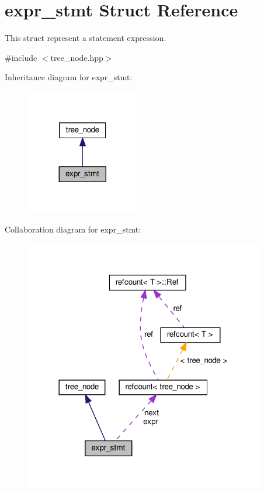 \hypertarget{structexpr__stmt}{}\section{expr\+\_\+stmt Struct Reference}
\label{structexpr__stmt}


This struct represent a statement expression.  




{\ttfamily \#include $<$tree\+\_\+node.\+hpp$>$}



Inheritance diagram for expr\+\_\+stmt\+:
\nopagebreak
\begin{figure}[H]
\begin{center}
\leavevmode
\includegraphics[width=140pt]{dc/deb/structexpr__stmt__inherit__graph}
\end{center}
\end{figure}


Collaboration diagram for expr\+\_\+stmt\+:
\nopagebreak
\begin{figure}[H]
\begin{center}
\leavevmode
\includegraphics[width=297pt]{d1/d46/structexpr__stmt__coll__graph}
\end{center}
\end{figure}
